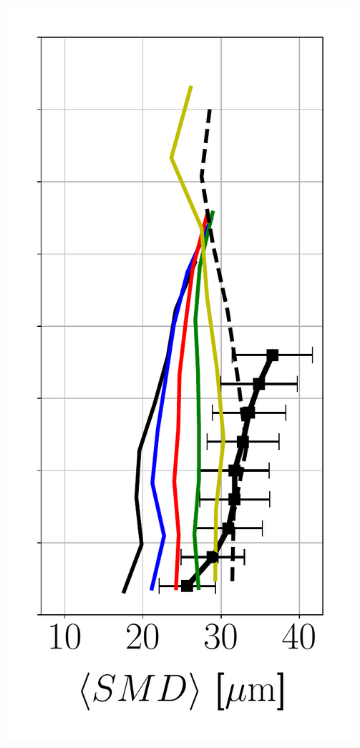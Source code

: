 \begin{figure}[h!]
\begin{subfigure}[b]{0.2\textwidth}
   \includegraphics[scale=0.35]{./part2_developments/figures_ch6_lagrangian_JICF/params_dx_atom/profiles/SMD_along_z}
\end{subfigure}
\hspace*{0.1in}

\end{figure}
